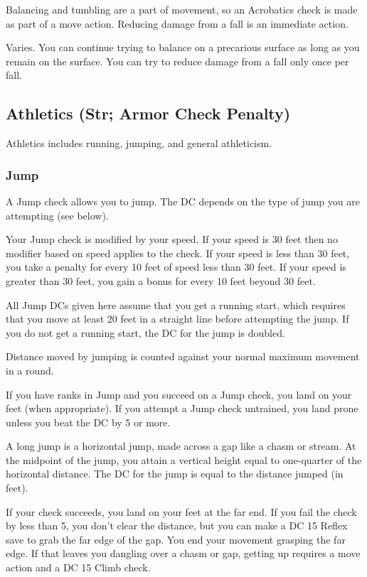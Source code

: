  Balancing and tumbling are a part of movement, so an Acrobatics check is made as part of a move action. Reducing damage from a fall is an immediate action.

 Varies. You can continue trying to balance on a precarious surface as long as you remain on the surface. You can try to reduce damage from a fall only once per fall.


\subsection{Athletics (Str; Armor Check Penalty)}
Athletics includes running, jumping, and general athleticism.

\subsubsection{Jump}

A Jump check allows you to jump. The DC depends on the type of jump you are attempting (see below).

Your Jump check is modified by your speed. If your speed is 30 feet then no modifier based on speed applies to the check. If your speed is less than 30 feet, you take a  penalty for every 10 feet of speed less than 30 feet. If your speed is greater than 30 feet, you gain a  bonus for every 10 feet beyond 30 feet.

All Jump DCs given here assume that you get a running start, which requires that you move at least 20 feet in a straight line before attempting the jump. If you do not get a running start, the DC for the jump is doubled.

Distance moved by jumping is counted against your normal maximum movement in a round.

If you have ranks in Jump and you succeed on a Jump check, you land on your feet (when appropriate). If you attempt a Jump check untrained, you land prone unless you beat the DC by 5 or more.

 A long jump is a horizontal jump, made across a gap like a chasm or stream. At the midpoint of the jump, you attain a vertical height equal to one-quarter of the horizontal distance. The DC for the jump is equal to the distance jumped (in feet).

If your check succeeds, you land on your feet at the far end. If you fail the check by less than 5, you don't clear the distance, but you can make a DC 15 Reflex save to grab the far edge of the gap. You end your movement grasping the far edge. If that leaves you dangling over a chasm or gap, getting up requires a move action and a DC 15 Climb check.

